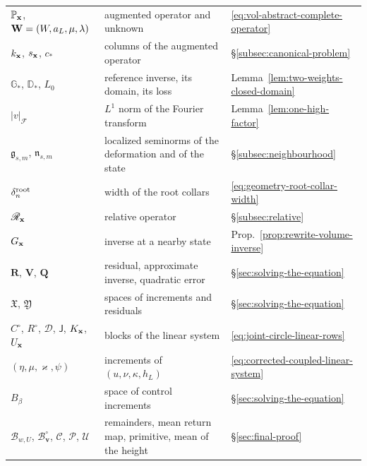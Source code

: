 \begin{longtable}{@{}p{.23\linewidth}p{.52\linewidth}p{.19\linewidth}@{}}
$\mathbb P_{\mathbf x}$, $\mathbf W=(W,a_L,\mu,\lambda)$ & augmented operator and
 unknown & \eqref{eq:vol-abstract-complete-operator}\\
$k_{\mathbf x}$, $s_{\mathbf x}$, $c_*$ & columns of the augmented operator
 & \S\ref{subsec:canonical-problem}\\
$\mathbb G_*$, $\mathbb D_*$, $L_0$ & reference inverse, its domain,
 its loss & Lemma~\ref{lem:two-weights-closed-domain}\\
$|v|_{\mathcal F}$ & $L^1$ norm of the Fourier transform
 & Lemma~\ref{lem:one-high-factor}\\
$\mathfrak g_{s,m}$, $\mathfrak n_{s,m}$ & localized seminorms of the
 deformation and of the state & \S\ref{subsec:neighbourhood}\\
$\delta_n^{\rm root}$ & width of the root collars
 & \eqref{eq:geometry-root-collar-width}\\
$\mathscr R_{\mathbf x}$ & relative operator & \S\ref{subsec:relative}\\
$G_{\mathbf x}$ & inverse at a nearby state
 & Prop.~\ref{prop:rewrite-volume-inverse}\\
$\mathbf R$, $\mathbf V$, $\mathbf Q$ & residual, approximate inverse,
 quadratic error & \S\ref{sec:solving-the-equation}\\
$\mathfrak X$, $\mathfrak Y$ & spaces of increments and residuals
 & \S\ref{sec:solving-the-equation}\\
$C^\circ$, $R^\circ$, $\mathcal D$, $\mathsf J$, $K_{\mathbf x}$, $U_{\mathbf x}$ &
 blocks of the linear system & \eqref{eq:joint-circle-linear-rows}\\
$(\eta,\mu,\varkappa,\psi)$ & increments of $(u,\nu,\kappa,h_L)$
 & \eqref{eq:corrected-coupled-linear-system}\\
$B_\beta$ & space of control increments
 & \S\ref{sec:solving-the-equation}\\
$\mathcal B_{w,U}$, $\mathcal B^\circ_{\mathbf v}$, $\mathcal C$,
$\mathscr P$, $\mathcal U$ & remainders, mean return map, primitive,
 mean of the height & \S\ref{sec:final-proof}\\
\bottomrule
\end{longtable}

